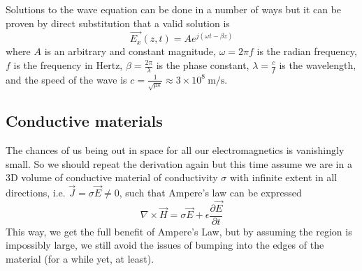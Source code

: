 \documentclass{tufte-handout}
\begin{document}
Solutions to the wave equation can be done in a number of ways but it can be proven by direct substitution 
that a valid solution is 
\begin{equation}
\vec{E_x}(z,t) = Ae^{j\left(\omega{}t-\beta{}z\right)}
\end{equation}
where $A$ is an arbitrary and constant magnitude, $\omega = 2\pi{}f$ is the radian frequency, $f$ is the frequency in Hertz, $\beta=\frac{2\pi}{\lambda}$ is the phase constant, $\lambda=\frac{c}{f}$ is the wavelength, and the speed of the wave is $c=\frac{1}{\sqrt{\mu\epsilon}}\approx 3\times10^8\SI{}{\metre\per\second}$.  

\subsection{Conductive materials}
The chances of us being out in space for all our electromagnetics is vanishingly small. So we should repeat the derivation again but this time assume we are in a 3D volume of conductive material of conductivity $\sigma$ with infinite extent in all directions, i.e. $\vec{J} = \sigma\vec{E} \neq0$, such that Ampere's law can be expressed
\begin{equation}
\nabla\times\vec{H} = \sigma\vec{E} + \epsilon\frac{\partial\vec{E}}{\partial t} \label{eq:amperesigma}
\end{equation}
 This way, we get the full benefit of Ampere's Law, but by assuming the region is impossibly large, we still avoid the issues of bumping into the edges of the material (for a while yet, at least).
\end{document}
